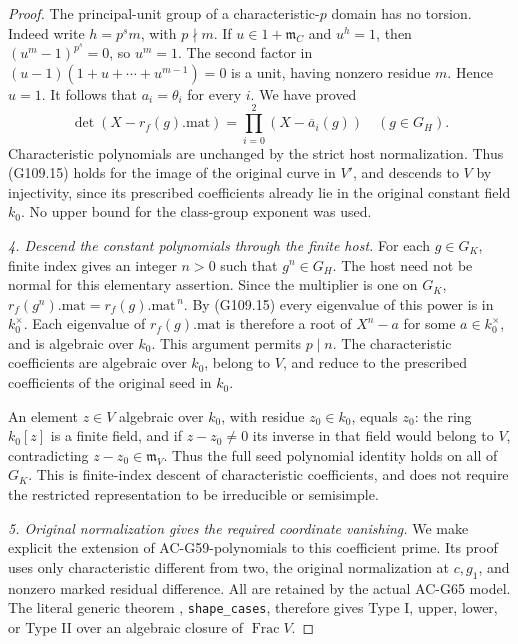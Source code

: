 \begin{proof}
The principal-unit group of a characteristic-\(p\) domain
has no torsion.  Indeed write \(h=p^s m\), with \(p\nmid m\).
If \(u\in1+\mathfrak m_C\) and \(u^h=1\), then
\((u^m-1)^{p^s}=0\), so \(u^m=1\).
The second factor in
\((u-1)(1+u+\cdots+u^{m-1})=0\)
is a unit, having nonzero residue \(m\).  Hence \(u=1\).
It follows that \(a_i=\theta_i\) for every \(i\).
We have proved
\[
 \det(X-r_f(g).\mathrm{mat})
       =\prod_{i=0}^2(X-\overline a_i(g))
                  \quad(g\in G_H).
 \tag{G109.15}
\]
Characteristic polynomials are unchanged by the strict
host normalization.  Thus (G109.15) holds for the image of
the original curve in \(V'\), and descends to \(V\) by
injectivity, since its prescribed coefficients already lie
in the original constant field \(k_0\).  No upper bound for
the class-group exponent was used.

\emph{4. Descend the constant polynomials through the finite host.}
For each \(g\in G_K\), finite index gives an integer \(n>0\)
such that \(g^n\in G_H\).  The host need not be normal for
this elementary assertion.  Since the multiplier is one on
\(G_K\), \(r_f(g^n).\mathrm{mat}=r_f(g).\mathrm{mat}^{\,n}\).
By (G109.15) every eigenvalue of this power is in \(k_0^\times\).
Each eigenvalue of \(r_f(g).\mathrm{mat}\) is therefore a
root of \(X^n-a\) for some \(a\in k_0^\times\), and is algebraic
over \(k_0\).  This argument permits \(p\mid n\).
The characteristic coefficients are algebraic over \(k_0\),
belong to \(V\), and reduce to the prescribed coefficients
of the original seed in \(k_0\).

An element \(z\in V\) algebraic over \(k_0\), with residue
\(z_0\in k_0\), equals \(z_0\): the ring \(k_0[z]\) is a finite
field, and if \(z-z_0\ne0\) its inverse in that field would
belong to \(V\), contradicting \(z-z_0\in\mathfrak m_V\).
Thus the full seed polynomial identity holds on all of \(G_K\).
This is finite-index descent of characteristic coefficients,
and does not require the restricted representation to be
irreducible or semisimple.

\emph{5. Original normalization gives the required coordinate vanishing.}
We make explicit the extension of AC-G59-polynomials to this
coefficient prime.  Its proof uses only characteristic different
from two, the original normalization at \(c,g_1\), and nonzero
marked residual difference.  All are retained by the actual
AC-G65 model.  The literal generic theorem
,
\texttt{shape\_cases}, therefore gives Type I, upper, lower,
or Type II over an algebraic closure of \(\operatorname{Frac}V\).


\end{proof}
